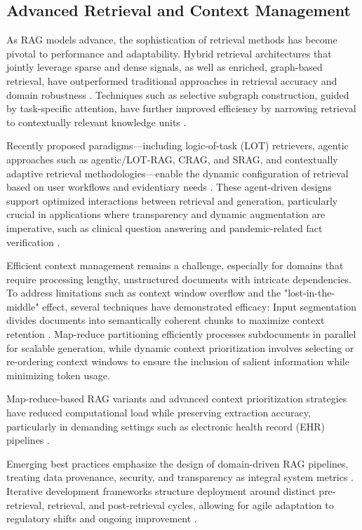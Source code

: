 \documentclass[sigconf]{acmart}
\begin{document}
\subsection{Advanced Retrieval and Context Management}

As RAG models advance, the sophistication of retrieval methods has become pivotal to performance and adaptability. Hybrid retrieval architectures that jointly leverage sparse and dense signals, as well as enriched, graph-based retrieval, have outperformed traditional approaches in retrieval accuracy and domain robustness \cite{ref3, ref8, ref10, ref12, ref29, ref31, ref37, ref47, ref48, ref52, ref54}. Techniques such as selective subgraph construction, guided by task-specific attention, have further improved efficiency by narrowing retrieval to contextually relevant knowledge units \cite{ref48, ref52}.

Recently proposed paradigms—including logic-of-task (LOT) retrievers, agentic approaches such as agentic/LOT-RAG, CRAG, and SRAG, and contextually adaptive retrieval methodologies—enable the dynamic configuration of retrieval based on user workflows and evidentiary needs \cite{ref54, ref64}. These agent-driven designs support optimized interactions between retrieval and generation, particularly crucial in applications where transparency and dynamic augmentation are imperative, such as clinical question answering and pandemic-related fact verification \cite{ref54, ref64}.

Efficient context management remains a challenge, especially for domains that require processing lengthy, unstructured documents with intricate dependencies. To address limitations such as context window overflow and the "lost-in-the-middle" effect, several techniques have demonstrated efficacy: Input segmentation divides documents into semantically coherent chunks to maximize context retention \cite{ref5, ref10, ref15, ref16, ref43, ref49, ref52, ref54, ref55}. Map-reduce partitioning efficiently processes subdocuments in parallel for scalable generation, while dynamic context prioritization involves selecting or re-ordering context windows to ensure the inclusion of salient information while minimizing token usage.

Map-reduce-based RAG variants and advanced context prioritization strategies have reduced computational load while preserving extraction accuracy, particularly in demanding settings such as electronic health record (EHR) pipelines \cite{ref5, ref52, ref55}.

Emerging best practices emphasize the design of domain-driven RAG pipelines, treating data provenance, security, and transparency as integral system metrics \cite{ref63, ref64}. Iterative development frameworks structure deployment around distinct pre-retrieval, retrieval, and post-retrieval cycles, allowing for agile adaptation to regulatory shifts and ongoing improvement \cite{ref5, ref63}.
\end{document}
